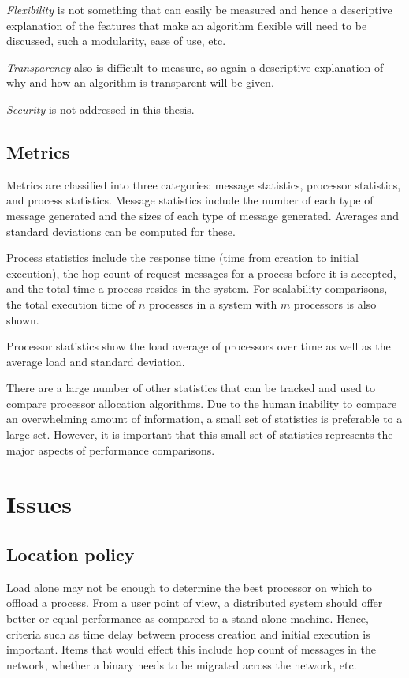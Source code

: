 \documentclass{report}
\begin{document}
\emph{Flexibility} is not something that can easily be measured and hence a
descriptive explanation of the features that make an algorithm flexible will
need to be discussed, such a modularity, ease of use, etc.

\emph{Transparency} also is difficult to measure, so again a descriptive
explanation of why and how an algorithm is transparent will be given.

\emph{Security} is not addressed in this thesis.


\subsection{Metrics}

\label{sec:metrics}

Metrics are classified into three categories: message statistics, processor
statistics, and process statistics.  Message statistics include the number
of each type of message generated and the sizes of each type of message
generated.  Averages and standard deviations can be computed for these.

Process statistics include the response time (time from creation to initial
execution), the hop count of request messages for a process before it is
accepted, and the total time a process resides in the system.  For
scalability comparisons, the total execution time of $n$ processes in a
system with $m$ processors is also shown.

Processor statistics show the load average of processors over time as well
as the average load and standard deviation.

There are a large number of other statistics that can be tracked and used to
compare processor allocation algorithms.  Due to the human inability to
compare an overwhelming amount of information, a small set of statistics is
preferable to a large set.  However, it is important that this small set of
statistics represents the major aspects of performance comparisons.



\section{Issues}


\subsection{Location policy}

Load alone may not be enough to determine the best processor on which to
offload a process.  From a user point of view, a distributed system should
offer better or equal performance as compared to a stand-alone machine.
Hence, criteria such as time delay between process creation and initial
execution is important.  Items that would effect this include hop count of
messages in the network, whether a binary needs to be migrated across the
network, etc.
\end{document}

